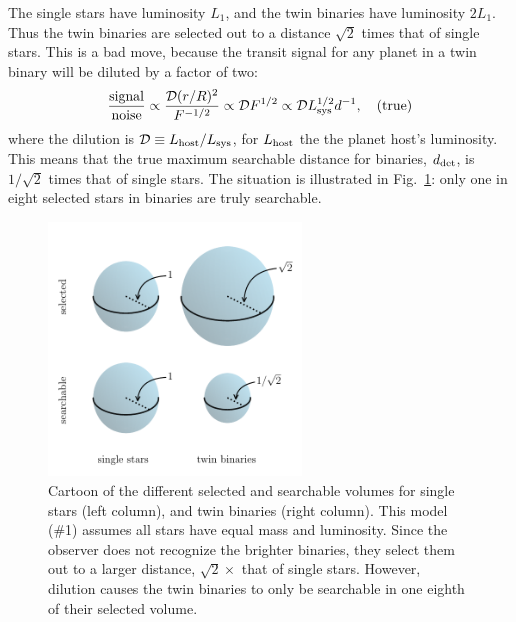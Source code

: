 The single stars have luminosity $L_1$, and the twin binaries have luminosity 
$2L_1$.
Thus the twin binaries are selected out to a distance $\sqrt{2}$ times 
that of single stars.
This is a bad move, because the transit signal for any planet in a 
twin binary will be diluted by a factor of two:
\begin{equation}
\frac{{\rm signal}}{{\rm noise}}
\propto \frac{\mathcal{D} (r/R)^2}{F^{-1/2}}
\propto \mathcal{D} F^{1/2}
\propto \mathcal{D} L_{\rm sys}^{1/2} d^{-1}, \quad ({\rm true})
\end{equation}
where the dilution is $\mathcal{D} \equiv L_{\rm host}/L_{\rm sys}$, for 
$L_{\rm host}$ the the planet host's luminosity.
This means that the true maximum searchable distance for binaries, $d_{\rm 
det}$, is $1/\sqrt{2}$ times that of single stars.
The situation is illustrated in Fig.~\ref{fig:model_1_volumes}: only one in 
eight selected stars in binaries are truly searchable.

\begin{figure}[!tb]
    \begin{center}
        \includegraphics[width=0.6\textwidth]{figures/visualize_volumes.pdf}
    \end{center}
    \caption{
        Cartoon of the different selected and searchable volumes for single 
        stars (left column), and twin binaries (right column).
        This model (\#1) assumes all stars have equal mass and luminosity.
        Since the observer does not recognize the brighter binaries, they 
        select 
        them out to a larger distance, $\sqrt{2}\times$ that of single stars.
        However, dilution causes the twin binaries to only be searchable in 
        one 
        eighth of their selected volume.
    }
    \label{fig:model_1_volumes}
\end{figure}


